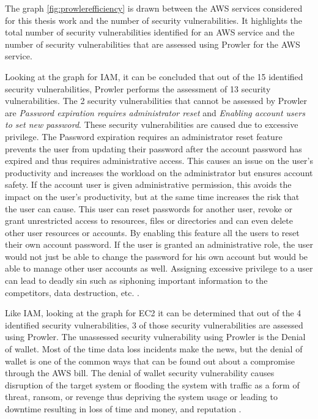 \par The graph \ref{fig:prowlerefficiency} is drawn between the AWS services considered for this thesis work and the number of security vulnerabilities.
It highlights the total number of security vulnerabilities identified for an AWS service and the number of security vulnerabilities that are assessed using Prowler for the AWS service.

\par Looking at the graph for IAM, it can be concluded that out of the 15 identified security vulnerabilities, Prowler performs the assessment of 13 security vulnerabilities.
The 2 security vulnerabilities that cannot be assessed by
Prowler are \textit{Password expiration requires
administrator reset} and \textit{Enabling account users
to set new password}.
These security vulnerabilities are caused due to excessive privilege.
The Password expiration requires an administrator reset feature prevents the user from updating their password after the account password has expired and thus requires administrative access.
This causes an issue on the user’s productivity and increases the workload on the administrator but ensures account safety.
If the account user is given administrative permission, this avoids the impact on the user’s productivity, but at the same time increases the risk that the user can cause.
This user can reset passwords for another user, revoke or grant unrestricted access to resources, files or directories and can even delete other user resources or accounts.
By enabling this feature all the users to reset their
own account password.
If the user is granted an administrative role, the user would not just be able to change the password for his own account but would be able to manage other user accounts as well.
Assigning excessive privilege to a user can lead to 
deadly sin such as siphoning important information to the
competitors, data destruction, etc. \cite{89}.

\par Like IAM, looking at the graph for EC2 it can be determined that out of the 4 identified security vulnerabilities, 3 of those security vulnerabilities are assessed using Prowler.
 The unassessed security vulnerability using Prowler is the Denial of wallet.
 Most of the time data loss incidents make the news, but the denial of wallet is one of the common ways that can be found out about a compromise through the AWS bill.
 The denial of wallet security vulnerability causes 
disruption of the target system or flooding the system 
with traffic as a form of threat, ransom, or revenge thus
depriving the system usage or leading to downtime 
resulting in loss of time and money, and reputation
\cite{90}.

